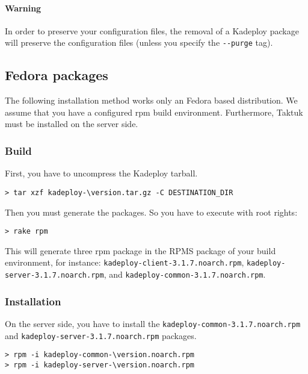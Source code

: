 \documentclass[a4wide,10pt,oneside]{book}
\newcommand{\version}{3.1.7}
\begin{document}
\paragraph{Warning}
In order to preserve your configuration files, the removal of a Kadeploy package will preserve the configuration files (unless you specify the \texttt{-{}-purge} tag).

\subsection{Fedora packages}
The following installation method works only an Fedora based distribution. We assume that you have a configured rpm build environment. Furthermore, Taktuk must be installed on the server side.
\subsubsection{Build}
\noindent First, you have to uncompress the Kadeploy tarball.
\begin{small}
\begin{Verbatim}[commandchars=\\\{\}]
> tar xzf kadeploy-\version.tar.gz -C DESTINATION_DIR
\end{Verbatim}
\end{small}

\noindent Then you must generate the packages. So you have to execute with root rights:
\begin{small}
\begin{verbatim}
> rake rpm
\end{verbatim}
\end{small}
This will generate three rpm package in the RPMS package of your build environment, for instance: \texttt{kadeploy-client-\version.noarch.rpm}, \texttt{kadeploy-server-\version.noarch.rpm}, and \texttt{kadeploy-common-\version.noarch.rpm}.
\subsubsection{Installation}
\noindent On the server side, you have to install the \texttt{kadeploy-common-\version.noarch.rpm} and \texttt{kadeploy-server-\version.noarch.rpm} packages.
\begin{small}
\begin{Verbatim}[commandchars=\\\{\}]
> rpm -i kadeploy-common-\version.noarch.rpm
> rpm -i kadeploy-server-\version.noarch.rpm
\end{Verbatim}
\end{small}
\end{document}
